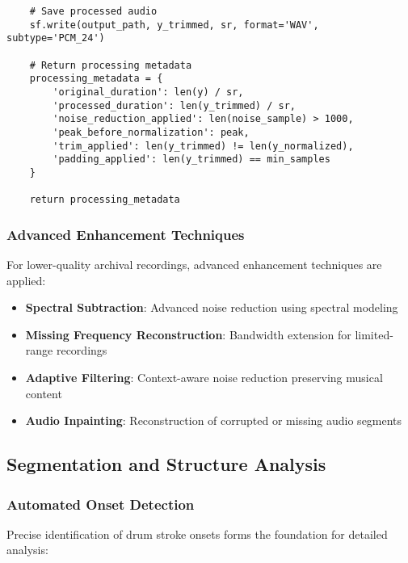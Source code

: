 \documentclass[12pt]{article}
\begin{document}
\begin{verbatim}
    # Save processed audio
    sf.write(output_path, y_trimmed, sr, format='WAV', subtype='PCM_24')
    
    # Return processing metadata
    processing_metadata = {
        'original_duration': len(y) / sr,
        'processed_duration': len(y_trimmed) / sr,
        'noise_reduction_applied': len(noise_sample) > 1000,
        'peak_before_normalization': peak,
        'trim_applied': len(y_trimmed) != len(y_normalized),
        'padding_applied': len(y_trimmed) == min_samples
    }
    
    return processing_metadata
\end{verbatim}

\subsubsection{Advanced Enhancement Techniques}
For lower-quality archival recordings, advanced enhancement techniques are applied:

\begin{itemize}
    \item \textbf{Spectral Subtraction}: Advanced noise reduction using spectral modeling
    \item \textbf{Missing Frequency Reconstruction}: Bandwidth extension for limited-range recordings
    \item \textbf{Adaptive Filtering}: Context-aware noise reduction preserving musical content
    \item \textbf{Audio Inpainting}: Reconstruction of corrupted or missing audio segments
\end{itemize}

\subsection{Segmentation and Structure Analysis}

\subsubsection{Automated Onset Detection}
Precise identification of drum stroke onsets forms the foundation for detailed analysis:
\end{document}
